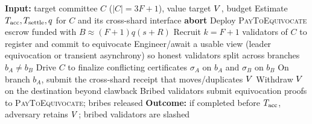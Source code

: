 \begin{algorithm}[t]
\caption{Sub-threshold committee bribery with accountability race}
\label{alg:attack}
\begin{algorithmic}[1]
\State \textbf{Input:} target committee $C$ ($|C|=3F{+}1$), value target $V$, budget
\State Estimate $T_{\mathrm{acc}},T_{\mathrm{settle}},q$ for $C$ and its cross-shard interface
  \State \textbf{abort} 
\EndIf
\State Deploy \textsc{PayToEquivocate} escrow funded with $B \approx (F{+}1)q(s{+}R)$
\State Recruit $k=F{+}1$ validators of $C$ to register and commit to equivocate
\State Engineer/await a usable view (leader equivocation or transient asynchrony) so honest
       validators split across branches $b_A \ne b_B$
\State Drive $C$ to finalize conflicting certificates $\sigma_A$ on $b_A$ and $\sigma_B$ on $b_B$
\State On branch $b_A$, submit the cross-shard receipt that moves/duplicates $V$
\State Withdraw $V$ on the destination beyond clawback 
\State Bribed validators submit equivocation proofs to \textsc{PayToEquivocate}; bribes released
\State \textbf{Outcome:} if completed before $T_{\mathrm{acc}}$, adversary retains $V$; bribed validators
       are slashed
\end{algorithmic}
\end{algorithm}

